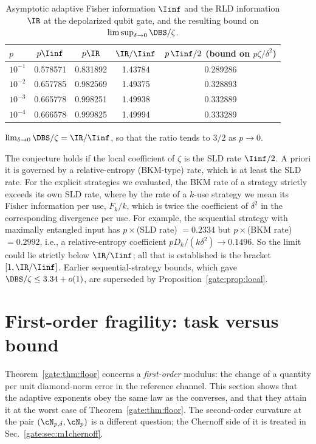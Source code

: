 \begin{table}[!tbp]
\centering
\caption{Asymptotic adaptive Fisher information $\Iinf$ and the RLD information $\IR$ at the depolarized qubit gate, and the resulting bound on $\limsup_{\delta\to0}\DBS/\zeta$.}
\label{gate:tab:SFinf}
\begin{tabular}{lcccc}
\toprule
$p$ & $p\Iinf$ & $p\IR$ & $\IR/\Iinf$ & $p\,\Iinf/2$ (bound on $p\zeta/\delta^2$)\\
\midrule
$10^{-1}$ & 0.578571 & 0.831892 & 1.43784 & 0.289286\\
$10^{-2}$ & 0.657785 & 0.982569 & 1.49375 & 0.328893\\
$10^{-3}$ & 0.665778 & 0.998251 & 1.49938 & 0.332889\\
$10^{-4}$ & 0.666578 & 0.999825 & 1.49994 & 0.333289\\
\bottomrule
\end{tabular}
\end{table}

\begin{conjecture*}%
$\lim_{\delta\to0}\DBS/\zeta=\IR/\Iinf$, so that the ratio tends to $3/2$ as $p\to0$.
\end{conjecture*}
The conjecture holds if the local coefficient of $\zeta$ is the SLD rate $\Iinf/2$. A priori it is governed by a relative-entropy (BKM-type) rate, which is at least the SLD rate. For the explicit strategies we evaluated, the BKM rate of a strategy strictly exceeds its own SLD rate, where by the rate of a $k$-use strategy we mean its Fisher information per use, $F_k/k$, which is twice the coefficient of $\delta^2$ in the corresponding divergence per use. For example, the sequential strategy with maximally entangled input has $p\times$(SLD rate) $=0.2334$ but $p\times$(BKM rate) $=0.2992$, i.e., a relative-entropy coefficient $pD_k/(k\delta^2)\to0.1496$. So the limit could lie strictly below $\IR/\Iinf$; all that is established is the bracket $[1,\IR/\Iinf]$. Earlier sequential-strategy bounds, which gave $\DBS/\zeta\le3.34+o(1)$, are superseded by Proposition~\ref{gate:prop:local}.

\section{First-order fragility: task versus bound}\label{gate:sec:m1first}

Theorem~\ref{gate:thm:floor} concerns a \emph{first-order} modulus: the change of a quantity per unit diamond-norm error in the reference channel. This section shows that the adaptive exponents obey the same law as the converses, and that they attain it at the worst case of Theorem~\ref{gate:thm:floor}. The second-order curvature at the pair $(\cN_{p,\delta},\cN_p)$ is a different question; the Chernoff side of it is treated in Sec.~\ref{gate:sec:m1chernoff}.


